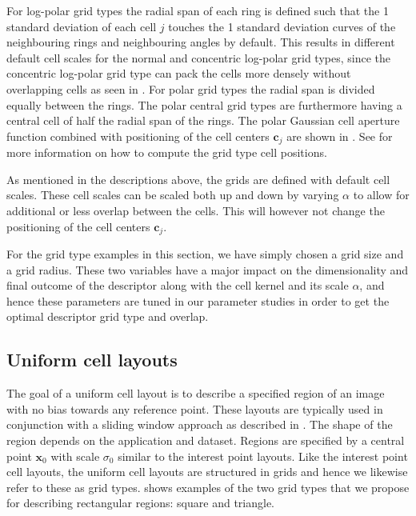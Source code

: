 \documentclass[thesis.tex]{subfiles}
\def\x{\mathbf{x}}
\def\c{\mathbf{c}}
\begin{document}
For log-polar grid types the radial span of each ring is defined such that the 1 standard deviation of each cell $j$ touches the 1 standard deviation curves of the neighbouring rings and neighbouring angles by default. This results in different default cell scales for the normal and concentric log-polar grid types, since the concentric log-polar grid type can pack the cells more densely without overlapping cells as seen in .
For polar grid types the radial span is divided equally between the rings. The polar central grid types are furthermore having a central cell of half the radial span of the rings. The polar Gaussian cell aperture function combined with positioning of the cell centers $\c_j$ are shown in .
See  for more information on how to compute the grid type cell positions.

As mentioned in the descriptions above, the grids are defined with default cell scales. These cell scales can be scaled both up and down by varying $\alpha$ to allow for additional or less overlap between the cells. This will however not change the positioning of the cell centers $\c_j$.

For the grid type examples in this section, we have simply chosen a grid size and a grid radius. These two variables have a major impact on the dimensionality and final outcome of the descriptor along with the cell kernel and its scale $\alpha$, and hence these parameters are tuned in our parameter studies in order to get the optimal descriptor grid type and overlap.

\subsection{Uniform cell layouts}
\label{sec:cellApertureFunctionRegion}

The goal of a uniform cell layout is to describe a specified region of an image with no bias towards any reference point. These layouts are typically used in conjunction with a sliding window approach as described in . The shape of the region depends on the application and dataset. Regions are specified by a central point $\x_0$ with scale $\sigma_0$ similar to the interest point layouts. Like the interest point cell layouts, the uniform cell layouts are structured in grids and hence we likewise refer to these as grid types.
 shows examples of the two grid types that we propose for describing rectangular regions: square and triangle.
\end{document}
